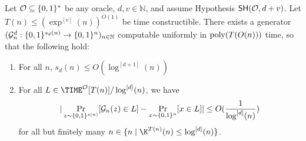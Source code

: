 \begin{theorem}\label{randomstrings:thm:elementary-generator}
Let $\mathcal{O} \subseteq \{0,1\}^*$ be any oracle, $d, v\in \mathbb{N}$, and assume Hypothesis $\mathsf{SH}(\mathcal{O},d+v)$. Let $T(n) \leq (\exp^{[v]}(n))^{O(1)}$ be time constructible. There exists a generator $(\mathcal{G}^d_n: \{0,1\}^{s_d(n)} \to \{0,1\}^n)_{n \in \mathbb{N}}$ computable uniformly in $\mathrm{poly}(T(O(n)))$ time, so that the following hold:
\begin{enumerate}
	\item For all $n$, $s_d(n) \leq  O(\log^{[d+1]}(n))$
	\item For all $L \in \TIME^\mathcal{O}[T(n)]/\log^{[d]}(n)$, we have
	\[
	|\Pr_{z \sim \{0,1\}^{s(n)}}[\mathcal{G}_n(z) \in L] - \Pr_{x \sim \{0,1\}^n}[x \in L]| \leq O(\frac{1}{\log^{[d]}(n)})
	\]
	for all but finitely many $n\in \{n \mid \K^{T(n)}(n) \leq \log^{[d]}(n)\}$.
\end{enumerate}
\end{theorem}
